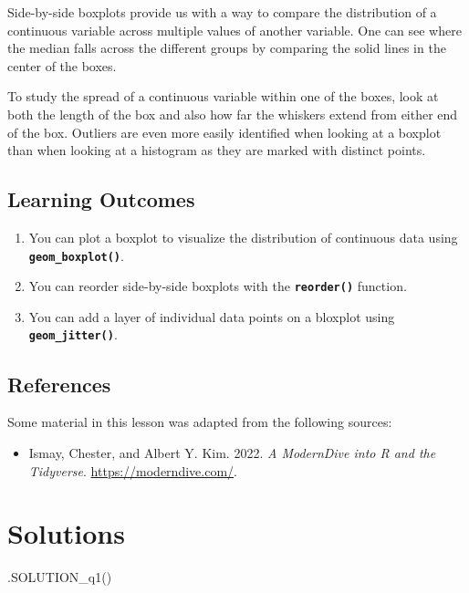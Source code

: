 \documentclass[
  letterpaper,
  DIV=11,
  numbers=noendperiod]{scrreprt}
\newenvironment{Shaded}{\begin{snugshade}}{\end{snugshade}}
\newcommand{\FunctionTok}[1]{\textcolor[rgb]{0.28,0.35,0.67}{#1}}
\newcommand{\NormalTok}[1]{\textcolor[rgb]{0.00,0.23,0.31}{#1}}
\providecommand{\tightlist}{%
  \setlength{\itemsep}{0pt}\setlength{\parskip}{0pt}}\usepackage{longtable,booktabs,array}
\begin{document}
Side-by-side boxplots provide us with a way to compare the distribution
of a continuous variable across multiple values of another variable. One
can see where the median falls across the different groups by comparing
the solid lines in the center of the boxes.

To study the spread of a continuous variable within one of the boxes,
look at both the length of the box and also how far the whiskers extend
from either end of the box. Outliers are even more easily identified
when looking at a boxplot than when looking at a histogram as they are
marked with distinct points.

\hypertarget{learning-outcomes-1}{%
\subsection{Learning Outcomes}\label{learning-outcomes-1}}

\begin{enumerate}
\def\labelenumi{\arabic{enumi}.}
\tightlist
\item
  You can plot a boxplot to visualize the distribution of continuous
  data using \textbf{\texttt{geom\_boxplot()}}.
\item
  You can reorder side-by-side boxplots with the
  \textbf{\texttt{reorder()}} function.
\item
  You can add a layer of individual data points on a bloxplot using
  \textbf{\texttt{geom\_jitter()}}.
\end{enumerate}

\hypertarget{references-17}{%
\subsection*{References}\label{references-17}}

Some material in this lesson was adapted from the following sources:

\begin{itemize}
\tightlist
\item
  Ismay, Chester, and Albert Y. Kim. 2022. \emph{A ModernDive into R and
  the Tidyverse}. \url{https://moderndive.com/}.
\end{itemize}

\hypertarget{solutions-13}{%
\section{Solutions}\label{solutions-13}}

\begin{Shaded}
\begin{Highlighting}[]
\FunctionTok{.SOLUTION\_q1}\NormalTok{()}
\end{Highlighting}
\end{Shaded}
\end{document}
